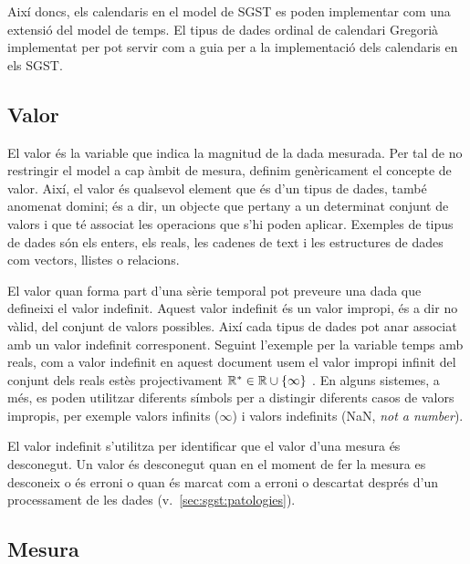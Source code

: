 Així doncs, els calendaris en el model de SGST es poden implementar
com una extensió del model de temps. El tipus de dades ordinal de
calendari Gregorià implementat per
\textcite[cap.~16]{date02:_tempor_data_relat_model} pot servir com a
guia per a la implementació dels calendaris en els SGST.




\subsection{Valor}
\label{sec:sgst:valor}

El valor és la variable que indica la magnitud de la dada
mesurada. Per tal de no restringir el model a cap àmbit de mesura,
definim genèricament el concepte de valor. Així, el valor és qualsevol
element que és d'un tipus de dades, també anomenat domini; és a dir,
un objecte que pertany a un determinat conjunt de valors i que té
associat les operacions que s'hi poden aplicar. Exemples de tipus de
dades són els enters, els reals, les cadenes de text i les estructures
de dades com vectors, llistes o relacions.



El valor quan forma part d'una sèrie temporal pot preveure una dada
que defineixi el valor indefinit.  Aquest valor indefinit és un valor
impropi, és a dir no vàlid, del conjunt de valors possibles. Així cada
tipus de dades pot anar associat amb un valor indefinit corresponent.
Seguint l'exemple per la variable temps amb reals, com a valor
indefinit en aquest document usem el valor impropi infinit del conjunt
dels reals estès projectivament $\mathbb{R}{}^*\in\mathbb{R}{} \cup
\{\infty\}$ \parencite{cantrell:projectivelyextendedreal}.  En alguns
sistemes, a més, es poden utilitzar diferents símbols per a distingir
diferents casos de valors impropis, per exemple valors infinits
($\infty$) i valors indefinits (NaN, \emph{not a number}).



El valor indefinit s'utilitza per identificar que el valor d'una
mesura és desconegut. Un valor és desconegut quan en el moment de fer
la mesura es desconeix o és erroni o quan és marcat com a erroni o
descartat després d'un processament de les dades
(v.~\autoref{sec:sgst:patologies}).





\subsection{Mesura}\label{sec:model:mesura} 

